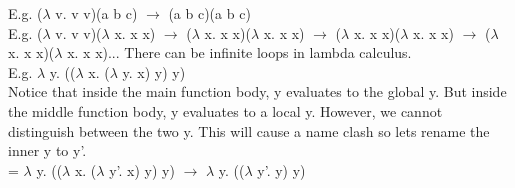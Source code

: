 \documentclass[12pt, letterpaper]{article}
\begin{document}
E.g. (\(\lambda\) v. v v)(a b c) \(\rightarrow\) (a b c)(a b c)\\

E.g. (\(\lambda\) v. v v)(\(\lambda\) x. x x) \(\rightarrow\) (\(\lambda\) x. x x)(\(\lambda\) x. x x) \(\rightarrow\) (\(\lambda\) x. x x)(\(\lambda\) x. x x) \(\rightarrow\) (\(\lambda\) x. x x)(\(\lambda\) x. x x)... There can be infinite loops in lambda calculus.\\

E.g. \(\lambda\) y. ((\(\lambda\) x. (\(\lambda\) y. x)  y) y)\\

Notice that inside the main function body, y evaluates to the global y. But inside the middle function body, y evaluates to a local y. However, we cannot distinguish between the two y. This will cause a name clash so lets rename the inner y to y'.\\

=  \(\lambda\) y. ((\(\lambda\) x. (\(\lambda\) y'. x)  y) y) \(\rightarrow\) 
\(\lambda\) y. ((\(\lambda\) y'. y) y)
\end{document}
